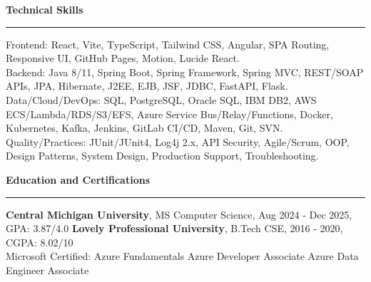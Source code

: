 \documentclass[10pt,letterpaper]{article}
\newcommand{\ressection}[1]{\vspace{2.6pt}\par\textbf{#1}\par\vspace{0.8pt}\hrule\vspace{1.6pt}}
\begin{document}
\ressection{Technical Skills}
Frontend: React, Vite, TypeScript, Tailwind CSS, Angular, SPA Routing, Responsive UI, GitHub Pages, Motion, Lucide React.\\
Backend: Java 8/11, Spring Boot, Spring Framework, Spring MVC, REST/SOAP APIs, JPA, Hibernate, J2EE, EJB, JSF, JDBC, FastAPI, Flask.\\
Data/Cloud/DevOps: SQL, PostgreSQL, Oracle SQL, IBM DB2, AWS ECS/Lambda/RDS/S3/EFS, Azure Service Bus/Relay/Functions, Docker, Kubernetes, Kafka, Jenkins, GitLab CI/CD, Maven, Git, SVN.\\
Quality/Practices: JUnit/JUnit4, Log4j 2.x, API Security, Agile/Scrum, OOP, Design Patterns, System Design, Production Support, Troubleshooting.

\ressection{Education and Certifications}
\textbf{Central Michigan University}, MS Computer Science, Aug 2024 - Dec 2025, GPA: 3.87/4.0 \textbar{} \textbf{Lovely Professional University}, B.Tech CSE, 2016 - 2020, CGPA: 8.02/10\\
Microsoft Certified: Azure Fundamentals \textbar{} Azure Developer Associate \textbar{} Azure Data Engineer Associate
\end{document}
